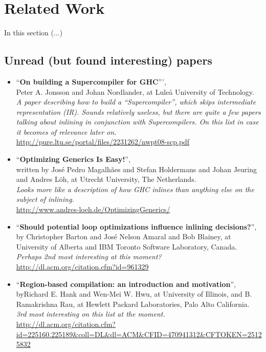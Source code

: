 
\section{Related Work}

In this section (...)

\subsection{Unread (but found interesting) papers}

\begin{itemize}
	\item ``\textbf{On building a Supercompiler for GHC}''', \\ Peter A. Jonsson
and Johan Nordlander, at Luleå University of Technology. \\
\textit{A paper describing how to build a ``Supercompiler'', which skips
intermediate representation (IR). Sounds relatively useless, but there are
quite a few papers talking about inlining in conjunction with Supercompilers.
On this list in case it becomes of relevance later on.}\\
\url{http://pure.ltu.se/portal/files/2231262/nwpt08-scp.pdf}

	\item ``\textbf{Optimizing Generics Is Easy!}'', \\ written by José Pedro
Magalhães and Stefan Holdermans and Johan Jeuring and Andres Löh, at Utrecht
University, The Netherlands. \\
\textit{Looks more like a description of how GHC inlines than anything else on
the subject of inlining.}\\
\url{http://www.andres-loeh.de/OptimizingGenerics/}

	\item ``\textbf{Should potential loop optimizations influence inlining
decisions?}'', by Christopher Barton and José Nelson Amaral and Bob Blainey, at
University of Alberta and IBM Toronto Software Laboratory, Canada. \\
\textit{Perhaps 2nd most interesting at this moment?}\\
\url{http://dl.acm.org/citation.cfm?id=961329}

	\item ``\textbf{Region-based compilation: an introduction and motivation}'',
\\ byRichard E. Hank and Wen-Mei W. Hwu, at University of Illinois, and B.
Ramakrishna Rau, at Hewlett Packard Laboratories, Palo Alto California. \\
\textit{3rd most interesting on this list at the moment.} \\
\url{http://dl.acm.org/citation.cfm?id=225160.225189&coll=DL&dl=ACM&CFID=470941312&CFTOKEN=25125832}


\end{itemize}
